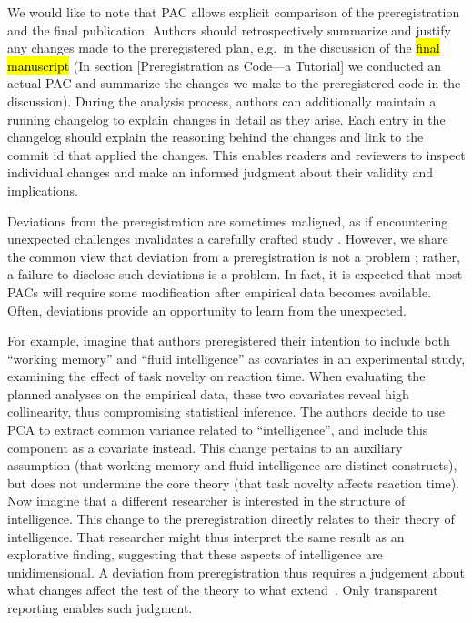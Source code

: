 \documentclass[psych,tutorial,accept,moreauthors,pdftex]{Definitions/mdpi}
\begin{document}
\begin{paracol}{2}
We would like to note that PAC allows explicit comparison of the
preregistration and the final publication. Authors should
retrospectively summarize and justify any changes made to the
preregistered plan, e.g.~in the discussion of the \hl{final manuscript} %
({In section {[}Preregistration as Code---a Tutorial{]} we
  conducted an actual PAC and summarize the changes we make to the
  preregistered code in the discussion}). During the analysis process,
authors can additionally maintain a running changelog to explain changes
in detail as they arise. Each entry in the changelog should explain the
reasoning behind the changes and link to the commit id that applied the
changes. This enables readers and reviewers to inspect individual
changes and make an informed judgment about their validity and
implications.

Deviations from the preregistration are sometimes maligned, as if
encountering unexpected challenges invalidates a carefully crafted study
\citep{szollosi_is_2020}. However, we share the common view that
deviation from a preregistration is not a problem
\citep{nosekPreregistrationHardWorthwhile2019}; rather, a failure to
disclose such deviations is a problem. In fact, it is expected that most
PACs will require some modification after empirical data becomes
available. Often, deviations provide an opportunity to learn from the
unexpected.

For example, imagine that authors preregistered their intention to
include both ``working memory'' and ``fluid intelligence'' as covariates
in an experimental study, examining the effect of task novelty on
reaction time. When evaluating the planned analyses on the empirical
data, these two covariates reveal high collinearity, thus compromising
statistical inference. The authors decide to use PCA to extract common
variance related to ``intelligence'', and include this component as a
covariate instead. This change pertains to an auxiliary assumption (that
working memory and fluid intelligence are distinct constructs), but does
not undermine the core theory (that task novelty affects reaction time).
Now imagine that a different researcher is interested in the structure
of intelligence. This change to the preregistration directly relates to
their theory of intelligence. That researcher might thus interpret the
same result as an explorative finding, suggesting that these aspects of
intelligence are unidimensional. A deviation from preregistration thus
requires a judgement about what changes affect the test of the theory to
what extend~\citep{meehlTheoreticalRisksTabular1978}. Only transparent
reporting enables such judgment.


\end{paracol}
\end{document}
